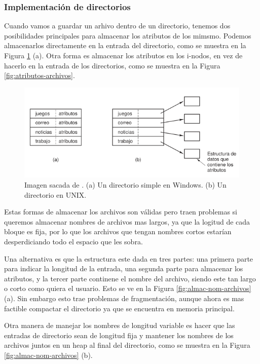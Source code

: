 \documentclass[12pt]{article}
\begin{document}
  \subsubsection{Implementación de directorios}
  Cuando vamos a guardar un arhivo dentro de un directorio, tenemos dos posibilidades principales para almacenar los atributos de los mimsmo. Podemos almacenarlos directamente en la entrada del directorio, como se muestra en la Figura \ref{fig:almac-atrib-archivos} (a). Otra forma es almacenar los atributos en los i-nodos, en vez de hacerlo en la entrada de los directorios, como se muestra en la Figura \ref{fig:atributos-archivos}.

  \begin{figure}[H]
    \centering
    \includegraphics[width=0.8\linewidth]{imagenes/almac-atrib-archivos.png}
    \caption{Imagen sacada de \parencite{tanenbaum}. (a) Un directorio simple en Windows. (b) Un directorio en UNIX.}
    \label{fig:almac-atrib-archivos}
  \end{figure}

  Estas formas de almacenar los archivos son válidas pero traen problemas si queremos almacenar nombres de archivos mas largos, ya que la logitud de cada bloque es fija, por lo que los archivos que tengan nombres cortos estarían desperdiciando todo el espacio que les sobra.

  Una alternativa es que la estructura este dada en tres partes: una primera parte para indicar la longitud de la entrada, una segunda parte para almacenar los atributos, y la tercer parte continene el nombre del archivo, siendo este tan largo o corto como quiera el usuario. Esto se ve en la Figura \ref{fig:almac-nom-archivos} (a). Sin embargo esto trae problemas de fragmentación, aunque ahora es mas factible compactar el directorio ya que se encuentra en memoria principal.

  Otra manera de manejar los nombres de longitud variable es hacer que las entradas de directorio sean de longitud fija y mantener los nombres de los archivos juntos en un heap al final del directorio, como se muestra en la Figura \ref{fig:almac-nom-archivos} (b).
\end{document}
